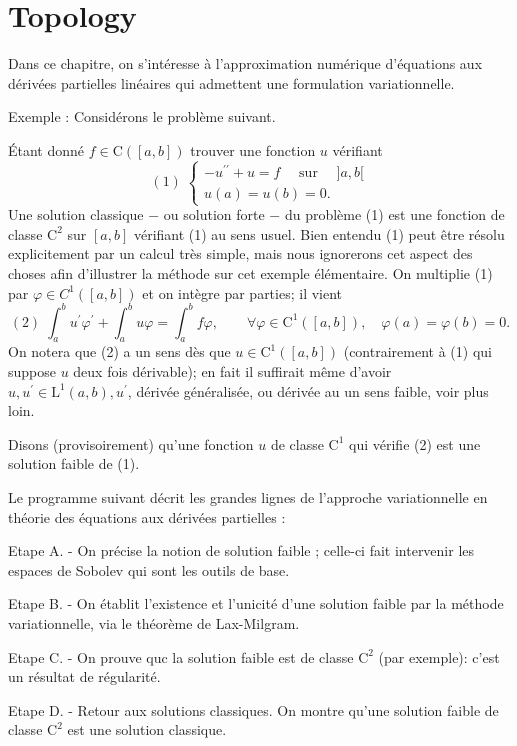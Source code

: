 \chapter{Topology}
Dans ce chapitre, on s'intéresse à l'approximation numérique d'équations aux dérivées partielles linéaires qui admettent une formulation variationnelle. 

Exemple :  Considérons le problème suivant. 

Étant donné $f \in \mathrm{C}([a, b])$ trouver une fonction $u$ vérifiant
$$
(1)\;  \left\{\begin{array}{l}
	-u^{\prime \prime}+u=f \quad \text { sur } \quad]a, b[ \\
	u(a)=u(b)=0.
\end{array}\right.
$$
Une solution classique $-$ ou solution forte $-$ du problème (1) est une fonction de classe $\mathrm{C}^{2}$ sur $[a, b]$ vérifiant (1) au sens usuel. Bien entendu (1) peut être résolu explicitement par un calcul très simple, mais nous ignorerons cet aspect des choses afin d'illustrer la méthode sur cet exemple élémentaire.
On multiplie (1) par $\varphi \in C^{1}([a, b])$ et on intègre par parties; il vient
$$(2) \; \int_{a}^{b} u^{\prime} \varphi^{\prime}+\int_{a}^{b} u \varphi=\int_{a}^{b} f \varphi,    \qquad \forall \varphi \in \mathrm{C}^{1}([a, b]), \quad \varphi(a)=\varphi(b)=0.
$$
On notera que (2) a un sens dès que $u \in \mathrm{C}^{1}([a, b])$ (contrairement à (1) qui suppose $u$ deux fois dérivable); en fait il suffirait même d'avoir $u, u^{\prime} \in \mathrm{L}^{1}(a, b), u^{\prime}$, dérivée généralisée, ou dérivée au  un sens faible, voir plus loin. 

 Disons (provisoirement) qu'une fonction $u$ de classe $\mathrm{C}^{1}$ qui vérifie (2) est une solution faible de (1).

Le programme suivant décrit les grandes lignes de l'approche variationnelle en théorie des équations aux dérivées partielles :

Etape A. - On précise la notion de solution faible ; celle-ci fait intervenir les espaces de Sobolev qui sont les outils de base.

Etape B. - On établit l'existence et l'unicité d'une solution faible par la méthode variationnelle, via le théorème de Lax-Milgram.

Etape C. - On prouve quc la solution faible est de classe $\mathrm{C}^{2}$ (par exemple): c'est un résultat de régularité.


Etape D. - Retour aux solutions classiques. On montre qu'une solution faible de classe $\mathrm{C}^{2}$ est une solution classique.


